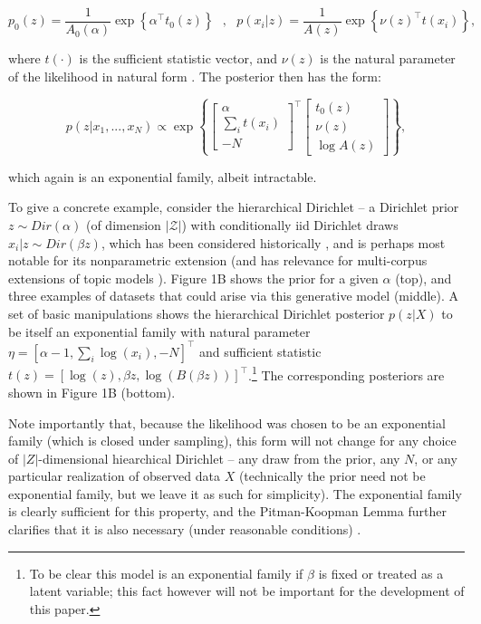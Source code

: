 \documentclass{article}
\begin{document}
$$ p_0(z) = \frac{1}{A_0(\alpha)} \exp\left\{ \alpha^\top t_0(z) \right \} ~~~ , ~~~ p(x_i|z) = \frac{1}{A(z)} \exp\left\{ \nu(z)^\top t(x_i) \right \},$$

where $t(\cdot)$ is the sufficient statistic vector, and $\nu(z)$ is the natural parameter of the likelihood in natural form \cite{robert2007bayesian}.   The posterior then has the form:

$$  p(z | x_1,...,x_N)  \propto  \exp\left\{ \begin{bmatrix} \alpha \\ \sum_i t(x_i) \\ -N \end{bmatrix}^\top\begin{bmatrix} t_0(z) \\ \nu(z) \\ \log A(z) \end{bmatrix} \right\},$$

which again is an exponential family, albeit intractable.

To give a concrete example, consider the hierarchical Dirichlet -- a Dirichlet prior $z\sim Dir(\alpha)$ (of dimension $|\mathcal{Z}|$) with conditionally iid Dirichlet draws $x_i | z \sim Dir(\beta z)$, which has been considered historically \cite{mackay1995hierarchical}, and is perhaps most notable for its nonparametric extension \cite{teh2006hdp} (and has relevance for multi-corpus extensions of topic models \cite{blei2003latent, pritchard2000inference}).  
Figure 1B shows the prior for a given $\alpha$ (top), and three examples of datasets that could arise via this generative model (middle).  
A set of basic manipulations shows the hierarchical Dirichlet posterior $p(z|X)$ to be itself an exponential family with natural parameter $\eta = \left[ \alpha -1 , \sum_i \log(x_i) , -N \right]^\top$ and sufficient statistic $t(z) = \left[ \log(z), \beta z , \log(B(\beta z)) \right]^\top$.\footnote{To be clear this model is an exponential family if $\beta$ is fixed or treated as a latent variable; this fact however will not be important for the development of this paper.}
The corresponding posteriors are shown in Figure 1B (bottom).  

Note importantly that, because the likelihood was chosen to be an exponential family (which is closed under sampling), this form will not change for any choice of $|Z|$-dimensional hiearchical Dirichlet -- any draw from the prior, any $N$, or any particular realization of observed data $X$ (technically the prior need not be exponential family, but we leave it as such for simplicity).  
The exponential family is clearly sufficient for this property, and the Pitman-Koopman Lemma further clarifies that it is also necessary (under reasonable conditions) \cite[\S3.3.3]{robert2007bayesian}.
\end{document}

